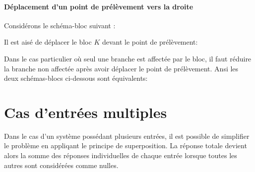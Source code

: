 \paragraph{Déplacement d'un point de prélèvement vers la droite}
Considérons le schéma-bloc suivant :
\begin{center}
    
\end{center}
Il est aisé de déplacer le bloc $K$ devant le point de prélèvement:  
\begin{center}
    
\end{center}
Dans le cas particulier où seul une branche est affectée par le bloc, 
il faut réduire la branche non affectée après avoir déplacer le point 
de prélèvement. Ansi les deux schémas-blocs ci-dessous sont équivalents:
\begin{center}
    
\end{center}
\newpage
\section{Cas d'entrées multiples\label{sec-bloc_multE}}
Dans le cas d'un système possédant plusieurs entrées, il est possible 
de simplifier le problème en appliqant le principe de superposition. La réponse 
totale devient alors la somme des réponses individuelles de chaque entrée 
lorsque toutes les autres sont considérées comme nulles.

